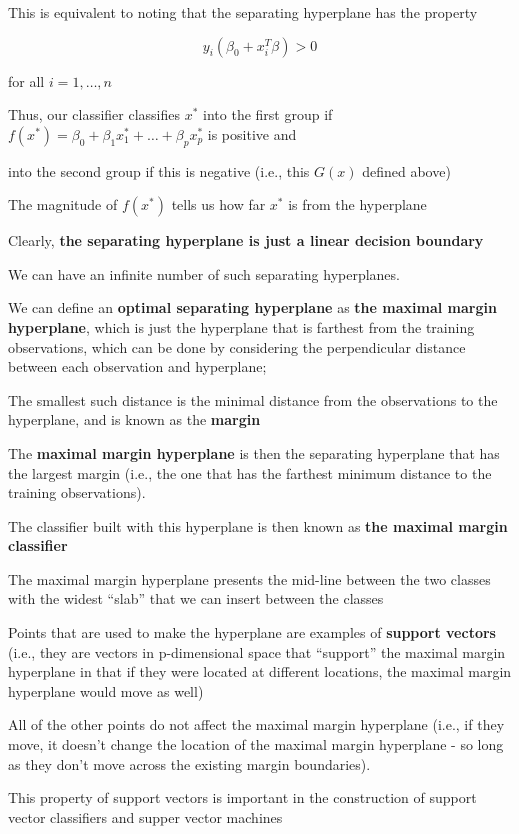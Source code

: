 \documentclass[
]{book}
\begin{document}
This is equivalent to noting that the separating hyperplane has the property

\[
y_i (\beta_0 + x_i^T \beta) >0
\]

for all \(i = 1, \dots, n\)

Thus, our classifier classifies \(x^*\) into the first group if \(f(x^*) = \beta_0 + \beta_1 x_1^* + \dots + \beta_p x_p^*\) is positive and

into the second group if this is negative (i.e., this \(G(x)\) defined above)

The magnitude of \(f(x^*)\) tells us how far \(x^*\) is from the hyperplane

Clearly, \textbf{the separating hyperplane is just a linear decision boundary}

We can have an infinite number of such separating hyperplanes.

We can define an \textbf{optimal separating hyperplane} as \textbf{the maximal margin hyperplane}, which is just the hyperplane that is farthest from the training observations, which can be done by considering the perpendicular distance between each observation and hyperplane;

The smallest such distance is the minimal distance from the observations to the hyperplane, and is known as the \textbf{margin}

The \textbf{maximal margin hyperplane} is then the separating hyperplane that has the largest margin (i.e., the one that has the farthest minimum distance to the training observations).

The classifier built with this hyperplane is then known as \textbf{the maximal margin classifier}

The maximal margin hyperplane presents the mid-line between the two classes with the widest ``slab'' that we can insert between the classes

Points that are used to make the hyperplane are examples of \textbf{support vectors} (i.e., they are vectors in p-dimensional space that ``support'' the maximal margin hyperplane in that if they were located at different locations, the maximal margin hyperplane would move as well)

All of the other points do not affect the maximal margin hyperplane (i.e., if they move, it doesn't change the location of the maximal margin hyperplane - so long as they don't move across the existing margin boundaries).

This property of support vectors is important in the construction of support vector classifiers and supper vector machines
\end{document}
